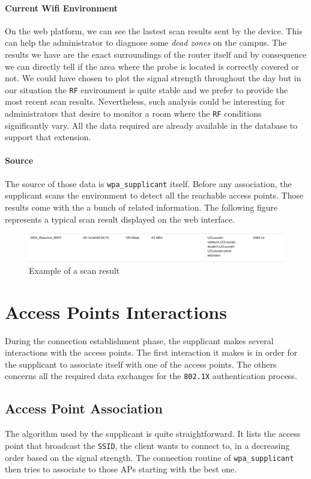 \paragraph*{Current Wifi Environment} On the web platform, we can see the lastest scan results sent by the device. This can help the administrator to diagnose some \emph{dead zones} on the campus. The results we have are the exact surroundings of the router itself and by consequence we can directly tell if the area where the probe is located is correctly covered or not. We could have chosen to plot the signal strength throughout the day but in our situation the \texttt{RF} environment is quite stable and we prefer to provide the most recent scan results. Nevertheless, such analysis could be interesting for administrators that desire to monitor a room where the \texttt{RF} conditions significantly vary. All the data required are already available in the database to support that extension.

\paragraph*{Source} The source of those data is \texttt{wpa\_supplicant} itself. Before any association, the supplicant scans the environment to detect all the reachable access points. Those results come with the a bunch of related information. The following figure represents a typical scan result displayed on the web interface.

\begin{figure}[H]
	\centering
   \includegraphics[width=1\textwidth]{Pictures/chapter6/scan-result.jpg}
   \caption{Example of a scan result}
\end{figure} 


\section{Access Points Interactions}
During the connection establishment phase, the supplicant makes several interactions with the access points. The first interaction it makes is in order for the supplicant to associate itself with one of the access points. The others concerns all the required data exchanges for the \texttt{802.1X} authentication process.

\subsection{Access Point Association}
The algorithm used by the supplicant is quite straightforward. It lists the access point that broadcast the \texttt{SSID}, the client wants to connect to, in a decreasing order based on the signal strength. The connection routine of \texttt{wpa\_supplicant} then tries to associate to those APs starting with the best one.

